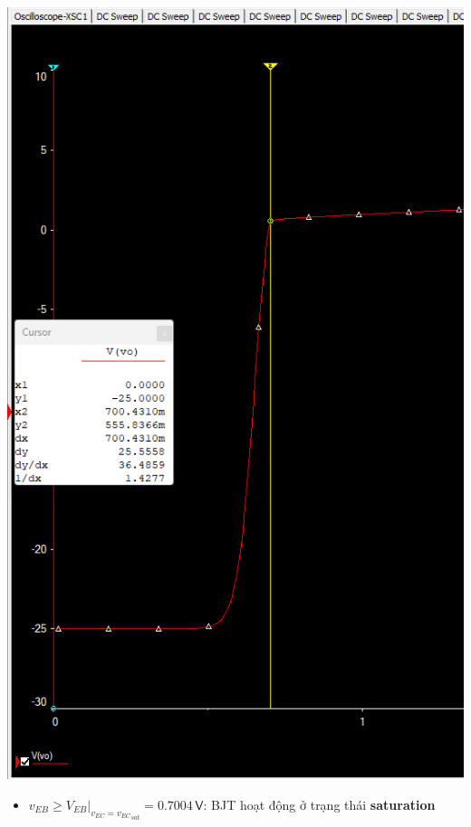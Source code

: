 \begin{minipage}{.4\linewidth}
	\includegraphics[width=\linewidth]{./my-chapters/my-images/Question2/a_VBE_sat.png}
\end{minipage}
\begin{minipage}{.4\linewidth}
	\begin{itemize}[label=-]
		\item $v_{EB}\geq\left.V_{EB}\right|_{v_{EC}={v_{EC}}_{sat}} = 0.7004\,\textsf{V}$: BJT hoạt động ở trạng thái \textbf{saturation}
	\end{itemize}
\end{minipage}


